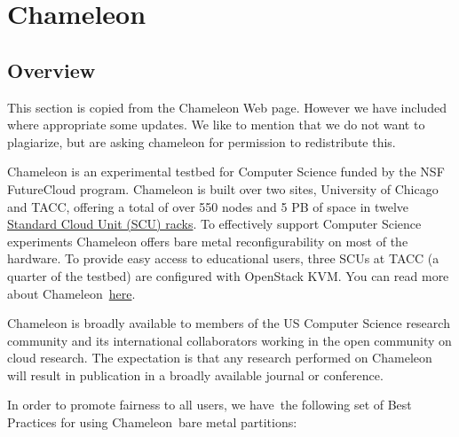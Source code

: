 
%


\part{Chameleon}
\label{P:chameleon}

\chapter{Overview}


\FILENAME

This section is copied from the Chameleon Web page. However we have
included where appropriate some updates. We like to mention that we do
not want to plagiarize, but are asking chameleon for permission to
redistribute this.

Chameleon is an experimental testbed for Computer Science funded by the
NSF FutureCloud program. Chameleon is built over two sites, University
of Chicago and TACC, offering a total of over 550 nodes and 5 PB of
space in twelve
\href{https://www.chameleoncloud.org/about/hardware-description/}{Standard
Cloud Unit (SCU) racks}. To effectively support Computer Science
experiments Chameleon offers bare metal reconfigurability on most of the
hardware. To provide easy access to educational users, three SCUs at
TACC (a quarter of the testbed) are configured with OpenStack KVM. You
can read more about
Chameleon~\href{https://www.chameleoncloud.org/about/chameleon/}{here}.

Chameleon is broadly available to members of the US Computer Science
research community and its international collaborators working in the
open community on cloud research. The expectation is that any research
performed on Chameleon will result in publication in a broadly
available journal or conference.

In order to promote fairness to all users, we have~the following set of
Best Practices for using Chameleon~bare metal partitions:

